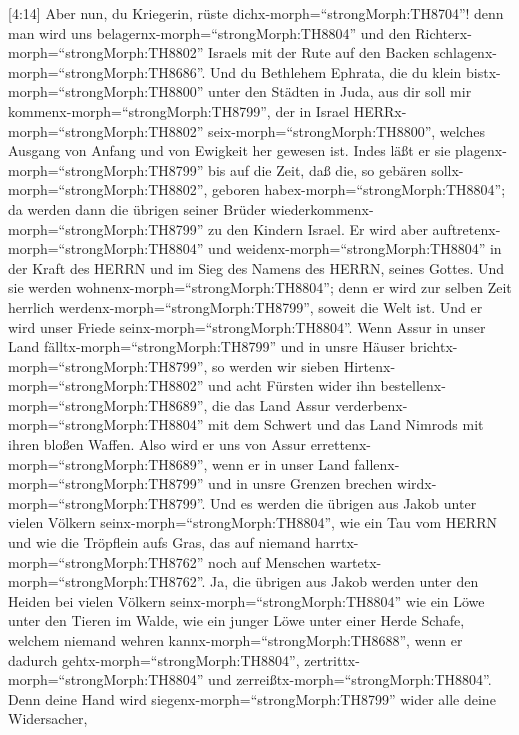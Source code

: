  {[}4:14{]} Aber nun, du Kriegerin, rüste
dichx-morph=``strongMorph:TH8704''! denn man wird uns
belagernx-morph=``strongMorph:TH8804'' und den
Richterx-morph=``strongMorph:TH8802'' Israels mit der Rute auf den
Backen schlagenx-morph=``strongMorph:TH8686''.  Und du
Bethlehem Ephrata, die du klein bistx-morph=``strongMorph:TH8800'' unter
den Städten in Juda, aus dir soll mir
kommenx-morph=``strongMorph:TH8799'', der in Israel
HERRx-morph=``strongMorph:TH8802'' seix-morph=``strongMorph:TH8800'',
welches Ausgang von Anfang und von Ewigkeit her gewesen ist.
 Indes läßt er sie plagenx-morph=``strongMorph:TH8799'' bis
auf die Zeit, daß die, so gebären sollx-morph=``strongMorph:TH8802'',
geboren habex-morph=``strongMorph:TH8804''; da werden dann die übrigen
seiner Brüder wiederkommenx-morph=``strongMorph:TH8799'' zu den Kindern
Israel.  Er wird aber
auftretenx-morph=``strongMorph:TH8804'' und
weidenx-morph=``strongMorph:TH8804'' in der Kraft des HERRN und im Sieg
des Namens des HERRN, seines Gottes. Und sie werden
wohnenx-morph=``strongMorph:TH8804''; denn er wird zur selben Zeit
herrlich werdenx-morph=``strongMorph:TH8799'', soweit die Welt ist.
 Und er wird unser Friede
seinx-morph=``strongMorph:TH8804''. Wenn Assur in unser Land
fälltx-morph=``strongMorph:TH8799'' und in unsre Häuser
brichtx-morph=``strongMorph:TH8799'', so werden wir sieben
Hirtenx-morph=``strongMorph:TH8802'' und acht Fürsten wider ihn
bestellenx-morph=``strongMorph:TH8689'',  die das Land Assur
verderbenx-morph=``strongMorph:TH8804'' mit dem Schwert und das Land
Nimrods mit ihren bloßen Waffen. Also wird er uns von Assur
errettenx-morph=``strongMorph:TH8689'', wenn er in unser Land
fallenx-morph=``strongMorph:TH8799'' und in unsre Grenzen brechen
wirdx-morph=``strongMorph:TH8799''.  Und es werden die
übrigen aus Jakob unter vielen Völkern
seinx-morph=``strongMorph:TH8804'', wie ein Tau vom HERRN und wie die
Tröpflein aufs Gras, das auf niemand harrtx-morph=``strongMorph:TH8762''
noch auf Menschen wartetx-morph=``strongMorph:TH8762''.  Ja,
die übrigen aus Jakob werden unter den Heiden bei vielen Völkern
seinx-morph=``strongMorph:TH8804'' wie ein Löwe unter den Tieren im
Walde, wie ein junger Löwe unter einer Herde Schafe, welchem niemand
wehren kannx-morph=``strongMorph:TH8688'', wenn er dadurch
gehtx-morph=``strongMorph:TH8804'',
zertrittx-morph=``strongMorph:TH8804'' und
zerreißtx-morph=``strongMorph:TH8804''.  Denn deine Hand
wird siegenx-morph=``strongMorph:TH8799'' wider alle deine Widersacher,
